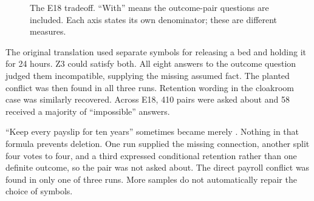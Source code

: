 \begin{figure}[H]
\centering
\begin{minipage}{0.48\linewidth}
\centering
{}
\end{minipage}\hfill
\begin{minipage}{0.48\linewidth}
\centering
{}
\end{minipage}
\caption{The E18 tradeoff. ``With'' means the outcome-pair questions are
included. Each axis states its own denominator; these are different measures.}
\label{fig:e18-tradeoff}
\end{figure}

The original translation used separate symbols for releasing a bed and holding
it for 24 hours. Z3 could satisfy both. All eight answers to the outcome
question judged them incompatible, supplying the missing assumed fact. The
planted conflict was then found in all three runs. Retention wording in the
cloakroom case was similarly recovered. Across E18, 410 pairs were asked about
and 58 received a majority of ``impossible'' answers.

``Keep every payslip for ten years'' sometimes became merely
. Nothing in that formula prevents deletion.
One run supplied the missing connection, another split four votes to four,
and a third expressed conditional retention rather than one definite outcome,
so the pair was not asked about. The direct payroll conflict was found in only
one of three runs. More samples do not automatically repair the choice of symbols.

